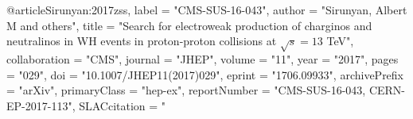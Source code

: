 @article{Sirunyan:2017zss,
      label          = "CMS-SUS-16-043",
      author         = "Sirunyan, Albert M and others",
      title          = "{Search for electroweak production of charginos and
                        neutralinos in WH events in proton-proton collisions at $
                        \sqrt{s}=13 $ TeV}",
      collaboration  = "CMS",
      journal        = "JHEP",
      volume         = "11",
      year           = "2017",
      pages          = "029",
      doi            = "10.1007/JHEP11(2017)029",
      eprint         = "1706.09933",
      archivePrefix  = "arXiv",
      primaryClass   = "hep-ex",
      reportNumber   = "CMS-SUS-16-043, CERN-EP-2017-113",
      SLACcitation   = "%
}


